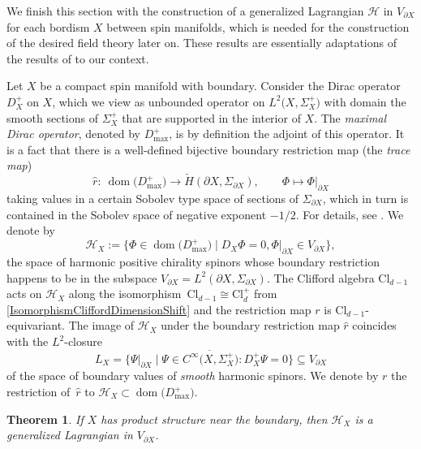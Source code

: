 \documentclass[10pt,a4paper]{amsart}
\numberwithin{equation}{section}
\newtheorem{Theorem}{Theorem}[section]
\DeclareMathOperator{\dom}{\mathrm{dom}}
\newcommand{\Cl}{\mathrm{Cl}}
\begin{document}
We finish this section with the construction of a generalized Lagrangian $\mathcal{H}$ in $V_{\partial X}$ for each bordism $X$ between spin manifolds, which is needed for the construction of the desired field theory later on.
These results are essentially adaptations of the results of \cite[Section~3]{LudewigRoos} to our context.



Let $X$ be a compact spin manifold with boundary.
Consider the Dirac operator $D_X^+$ on $X$, which we view as unbounded operator on $L^2\big(X, \Sigma_X^+\big)$ with domain the smooth sections of $\Sigma_X^+$ that are supported in the interior of $X$.
The \emph{maximal Dirac operator}, denoted by $D_{\max}^+$, is by definition the adjoint of this operator.
It is a fact that there is a well-defined bijective boundary restriction map (the \emph{trace map})
\begin{equation*}
 \hat{r}\colon\ \dom\big(D_{\max}^+\big) \longrightarrow \check H(\partial X, \Sigma_{\partial X}), \qquad \Phi \longmapsto \Phi|_{\partial X}
\end{equation*}
taking values in a certain Sobolev type space of sections of $\Sigma_{\partial X}$, which in turn is contained in the Sobolev space of negative exponent $-1/2$.
For details, see \cite{BaerBallmannGuide}.
We denote by
\begin{equation*}
 \mathcal{H}_X := \big\{ \Phi \in \dom\big(D_{\max}^+\big) \mid D_X \Phi = 0, \Phi|_{\partial X} \in V_{\partial X}\big\},
\end{equation*}
the space of harmonic positive chirality spinors whose boundary restriction happens to be in the subspace $V_{\partial X} = L^2(\partial X, \Sigma_{\partial X})$.
The Clifford algebra $\Cl_{d-1}$ acts on $\mathcal{H}_X$ along the isomorphism~${\Cl_{d-1} \cong \Cl_d^+}$ from \eqref{IsomorphismCliffordDimensionShift} and the restriction map $r$ is $\Cl_{d-1}$-equivariant.
The image of $\mathcal{H}_X$ under the boundary restriction map $\hat{r}$ coincides with the $L^2$-closure
\begin{equation*}%
 L_X = \overline{\big\{ \Psi|_{\partial X} \mid \Psi \in C^\infty\big(X, \Sigma_X^+\big) \colon D_X^+ \Psi = 0\big\}} \subseteq V_{\partial X}
\end{equation*}
of the space of boundary values of \emph{smooth} harmonic spinors.
We denote by $r$ the restriction of~$\hat{r}$ to $\mathcal{H}_X \subset \dom\big(D_{\max}^+\big)$.


\begin{Theorem} \label{ThmLXLagrangian}
If $X$ has product structure near the boundary, then $\mathcal{H}_X$ is a generalized Lagrangian in $V_{\partial X}$.
\end{Theorem}
\end{document}
